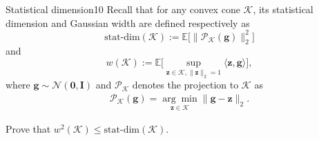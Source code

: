 \documentclass{article}
\begin{document}
\begin{problem}{Statistical dimension}{10}
Recall that for any convex cone $\mathcal{K}$, its statistical dimension and Gaussian width are defined respectively as
\[
    \text{stat-dim}(\mathcal{K}) := \mathbb{E} \big[ \|\mathcal{P}_{\mathcal{K}}(\bm{g}) \|_2^2 \big]
 \]
and 
\[
  w(\mathcal{K}):=\mathbb{E}\Bigg[\sup_{\bm{z}\in\mathcal{K}, \|\bm{z}\|_2=1 }\langle\bm{z},\bm{g}\rangle\Bigg],
\]where $\bm{g}\sim \mathcal{N}(\bm{0},\bm{I})$ and $\mathcal{P}_{\mathcal{K}}$ denotes the projection to $\mathcal{K}$ as
	\begin{align*}
	\mathcal{P}_{\mathcal{K}}(\bm{g})=\underset{\bm{z}\in\mathcal{K}}{\arg\min	}\|\bm{g}-\bm{z}\|_2.
	\end{align*}

	



 Prove that $  w^2(\mathcal{K}) \leq  \text{stat-dim}(\mathcal{K})  $.


\end{problem}
\end{document}
